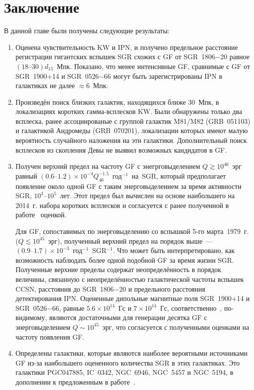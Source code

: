\section{Заключение}\label{Summary}
В данной главе были получены следующие результаты:
\begin{enumerate}
\item Оценена чувствительность KW и IPN, и получено 
предельное расстояние регистрации гигантских вспышек SGR схожих с GF от SGR~1806$-$20 
равное $(18\textrm{--}30) d_{15}$~Мпк. Показано, что менее интенсивные GF, сравнимые 
с GF от SGR~1900+14 и SGR~0526$-$66 могут быть зарегистрированы IPN в галактиках 
не далее $\approx 6$~Мпк.

\item Произведён поиск близких галактик, находящихся ближе 30~Мпк, в локализациях 
коротких гамма-всплесков KW. Были обнаружены только два всплеска, ранее 
ассоциированые с группой галактик M81/M82 (GRB~051103) и галактикой Андромеды (GRB~070201),
локализации которых имеют малую вероятность случайного наложения на эти галактики.
Дополнительный поиск всплесков из скопления Девы не выявил возможных кандидатов в GF.

\item Получен верхний предел на частоту GF с энегрговыделением $Q \gtrsim 10^{46}$~эрг равный
${(0.6\textrm{--}1.2)\times 10^{-4} Q_{46}^{-1.5}}$~год$^{-1}$~на~SGR, который предполагает 
появление около одной GF с таким энерговыделением за время активности SGR, $10^3\textrm{--}10^5$~лет. 
Этот предел был вычислен на основе наибольшего на 2014~г.  
набора коротких всплесков и согласуется с ранее полученной в работе~\citep{Ofek_2007ApJ} оценкой.

Для GF, сопоставимых по энерговыделению со вспышкой 5-го марта~1979~г. ($Q \lesssim 10^{45}$~эрг), 
полученный верхний предел на порядок выше~--- $(0.9\textrm{--}1.7)\times 10^{-3}$~год$^{-1}$~SGR$^{-1}$. 
Что может быть интерпретировано, как возможность наблюдать более одной подобной GF за время жизни SGR.
Полученные верхние пределы содержат неопределённость в порядок величины, связанную с
неопределённостью галактической частоты вспышек CCSN, расстояния до SGR~1806$-$20 и
предельного расстояния детектирования IPN.
Оцененные дипольные  магнитные поля SGR~1900+14 и SGR~0526$-$66, равные
$5.6\times10^{14}$~Гс и $7\times10^{14}$~Гс, соответственно~\citep{Olausen_Kaspi2014}, 
по-видимому, являются достаточными для генерации десятка GF с энерговыделением $Q \sim 10^{45}$~эрг,
что согласуется с полученными оценками на частоту появления GF.

\item Определены галактики, которые являются наиболее вероятными источниками GF 
из-за наибольшего оцененного количества SGR в этих галактиках. Это галактики
PGC047885, IC~0342, NGC~6946, NGC~5457 и NGC~5194, в дополнении к предложенным 
в работе~\citep{Popov2006}.
\end{enumerate}

